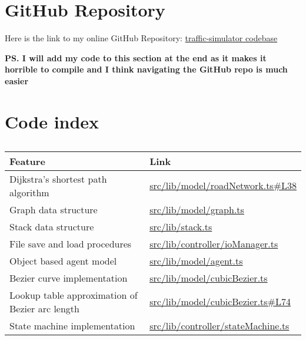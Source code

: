 \section{GitHub Repository}

    Here is the link to my online GitHub Repository: \href{https://github.com/joshua-smart/traffic-simulator}{traffic-simulator codebase}

    \textbf{PS. I will add my code to this section at the end as it makes it horrible to compile and I think navigating the GitHub repo is much easier}

    \section{Code index}

    \begin{table}
        \centering
        \begin{tabular}{|p{}|p{}|}
            \hline
            \textbf{Feature} & \textbf{Link}
            \\\hline
            Dijkstra's shortest path algorithm & \href{https://github.com/joshua-smart/traffic-simulator/blob/main/src/lib/model/roadNetwork.ts#L38}{src/lib/model/roadNetwork.ts\#L38}
            \\\hline
            Graph data structure & \href{https://github.com/joshua-smart/traffic-simulator/blob/main/src/lib/model/graph.ts}{src/lib/model/graph.ts}
            \\\hline
            Stack data structure & \href{https://github.com/joshua-smart/traffic-simulator/blob/main/src/lib/stack.ts}{src/lib/stack.ts}
            \\\hline
            File save and load procedures & \href{https://github.com/joshua-smart/traffic-simulator/blob/main/src/lib/controller/ioManager.ts}{src/lib/controller/ioManager.ts}
            \\\hline
            Object based agent model & \href{https://github.com/joshua-smart/traffic-simulator/blob/main/src/lib/model/agent.ts}{src/lib/model/agent.ts}
            \\\hline
            Bezier curve implementation & \href{https://github.com/joshua-smart/traffic-simulator/blob/main/src/lib/model/cubicBezier.ts}{src/lib/model/cubicBezier.ts}
            \\\hline
            Lookup table approximation of Bezier arc length & \href{https://github.com/joshua-smart/traffic-simulator/blob/main/src/lib/model/cubicBezier.ts#L74}{src/lib/model/cubicBezier.ts\#L74}
            \\\hline
            State machine implementation & \href{https://github.com/joshua-smart/traffic-simulator/blob/main/src/lib/controller/stateMachine.ts}{src/lib/controller/stateMachine.ts}
            \\\hline
        \end{tabular}
        \caption{}
        \label{}
    \end{table}
